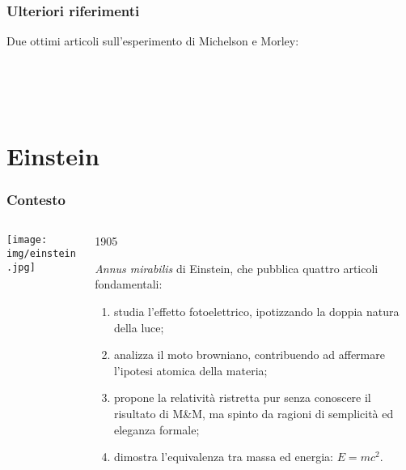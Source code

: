\documentclass[]{beamer}
\theoremstyle{plain}
\begin{document}
\begin{frame}
  \frametitle{Ulteriori riferimenti}
  Due ottimi articoli sull'esperimento di Michelson e Morley:\\~\\
  
\begin{center}
  \href{http://www.infinitoteatrodelcosmo.it/2017/10/09/la-favola-michelson-dei-due-fotoni-soluzione-del-quiz-sul-nobel/}{}\\~\\
  
  \href{http://www.infinitoteatrodelcosmo.it/2017/10/16/la-scomparsa-delletere-michelson-ad-einstein/}{}
\end{center}
\end{frame}

\section{Einstein}

\begin{frame}
\frametitle{Contesto}
\begin{columns}
\begin{column}{0.2\textwidth}
\texttt{[image: img/einstein.jpg]}
\end{column}
\begin{column}{0.7\textwidth}
\begin{center}
  1905
\end{center}
\emph{Annus mirabilis} di Einstein, che pubblica quattro articoli fondamentali:\pause

\begin{small}
\begin{enumerate}
\item<2-> studia l'effetto fotoelettrico, ipotizzando la \alert<2>{doppia natura della luce};
\item<3-> analizza il moto browniano, contribuendo ad affermare l'\alert<3>{ipotesi atomica della materia};
\item<4-> propone la \alert<4>{relatività ristretta} pur senza conoscere il risultato di M\&M, ma spinto da ragioni di semplicità ed eleganza formale;
\item<5-> dimostra l'equivalenza tra massa ed energia: \alert<5>{$ E=mc^2 $}.
\end{enumerate}
\end{small}
\end{column}
\end{columns}
\end{frame}
\end{document}
